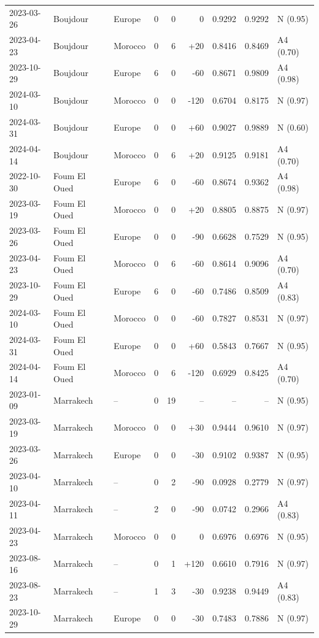 \documentclass[11pt,a4paper]{article}
\begin{document}
\begin{longtable}{@{}l l l r r r r r l@{}}
2023-03-26 & Boujdour & Europe & 0 & 0 & 0 & 0.9292 & 0.9292 & N (0.95) \\
2023-04-23 & Boujdour & Morocco & 0 & 6 & +20 & 0.8416 & 0.8469 & A4 (0.70) \\
2023-10-29 & Boujdour & Europe & 6 & 0 & -60 & 0.8671 & 0.9809 & A4 (0.98) \\
2024-03-10 & Boujdour & Morocco & 0 & 0 & -120 & 0.6704 & 0.8175 & N (0.97) \\
2024-03-31 & Boujdour & Europe & 0 & 0 & +60 & 0.9027 & 0.9889 & N (0.60) \\
2024-04-14 & Boujdour & Morocco & 0 & 6 & +20 & 0.9125 & 0.9181 & A4 (0.70) \\
\midrule
2022-10-30 & Foum El Oued & Europe & 6 & 0 & -60 & 0.8674 & 0.9362 & A4 (0.98) \\
2023-03-19 & Foum El Oued & Morocco & 0 & 0 & +20 & 0.8805 & 0.8875 & N (0.97) \\
2023-03-26 & Foum El Oued & Europe & 0 & 0 & -90 & 0.6628 & 0.7529 & N (0.95) \\
2023-04-23 & Foum El Oued & Morocco & 0 & 6 & -60 & 0.8614 & 0.9096 & A4 (0.70) \\
2023-10-29 & Foum El Oued & Europe & 6 & 0 & -60 & 0.7486 & 0.8509 & A4 (0.83) \\
2024-03-10 & Foum El Oued & Morocco & 0 & 0 & -60 & 0.7827 & 0.8531 & N (0.97) \\
2024-03-31 & Foum El Oued & Europe & 0 & 0 & +60 & 0.5843 & 0.7667 & N (0.95) \\
2024-04-14 & Foum El Oued & Morocco & 0 & 6 & -120 & 0.6929 & 0.8425 & A4 (0.70) \\
\midrule
2023-01-09 & Marrakech & -- & 0 & 19 & -- & -- & -- & N (0.95) \\
2023-03-19 & Marrakech & Morocco & 0 & 0 & +30 & 0.9444 & 0.9610 & N (0.97) \\
2023-03-26 & Marrakech & Europe & 0 & 0 & -30 & 0.9102 & 0.9387 & N (0.95) \\
2023-04-10 & Marrakech & -- & 0 & 2 & -90 & 0.0928 & 0.2779 & N (0.97) \\
2023-04-11 & Marrakech & -- & 2 & 0 & -90 & 0.0742 & 0.2966 & A4 (0.83) \\
2023-04-23 & Marrakech & Morocco & 0 & 0 & 0 & 0.6976 & 0.6976 & N (0.95) \\
2023-08-16 & Marrakech & -- & 0 & 1 & +120 & 0.6610 & 0.7916 & N (0.97) \\
2023-08-23 & Marrakech & -- & 1 & 3 & -30 & 0.9238 & 0.9449 & A4 (0.83) \\
2023-10-29 & Marrakech & Europe & 0 & 0 & -30 & 0.7483 & 0.7886 & N (0.97) \\
\end{longtable}
\endgroup
\end{document}

